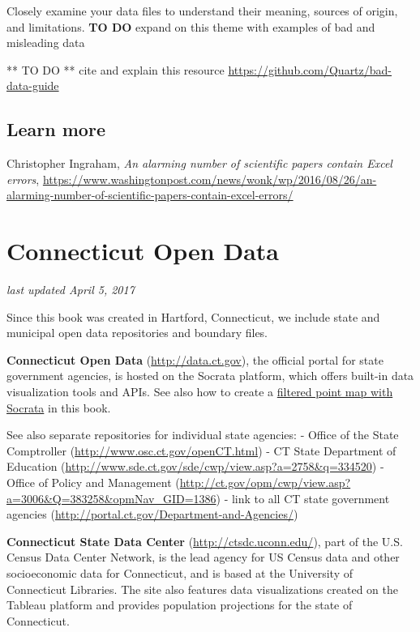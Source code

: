 \documentclass[
  english,
]{book}
\begin{document}
Closely examine your data files to understand their meaning, sources of origin, and limitations.
\textbf{TO DO} expand on this theme with examples of bad and misleading data

** TO DO ** cite and explain this resource
\url{https://github.com/Quartz/bad-data-guide}

\hypertarget{learn-more-4}{%
\subsection{Learn more}\label{learn-more-4}}

Christopher Ingraham, \emph{An alarming number of scientific papers contain Excel errors},
\url{https://www.washingtonpost.com/news/wonk/wp/2016/08/26/an-alarming-number-of-scientific-papers-contain-excel-errors/}

\hypertarget{ct}{%
\section{Connecticut Open Data}\label{ct}}

\emph{last updated April 5, 2017}

Since this book was created in Hartford, Connecticut, we include state and municipal open data repositories and boundary files.

\textbf{Connecticut Open Data} (\url{http://data.ct.gov}), the official portal for state government agencies, is hosted on the Socrata platform, which offers built-in data visualization tools and APIs. See also how to create a \href{filtered-point-map-socrata}{filtered point map with Socrata} in this book.

See also separate repositories for individual state agencies:
- Office of the State Comptroller (\url{http://www.osc.ct.gov/openCT.html})
- CT State Department of Education (\url{http://www.sde.ct.gov/sde/cwp/view.asp?a=2758\&q=334520})
- Office of Policy and Management (\url{http://ct.gov/opm/cwp/view.asp?a=3006\&Q=383258\&opmNav_GID=1386})
- link to all CT state government agencies (\url{http://portal.ct.gov/Department-and-Agencies/})

\textbf{Connecticut State Data Center} (\url{http://ctsdc.uconn.edu/}), part of the U.S. Census Data Center Network, is the lead agency for US Census data and other socioeconomic data for Connecticut, and is based at the University of Connecticut Libraries. The site also features data visualizations created on the Tableau platform and provides population projections for the state of Connecticut.
\end{document}
